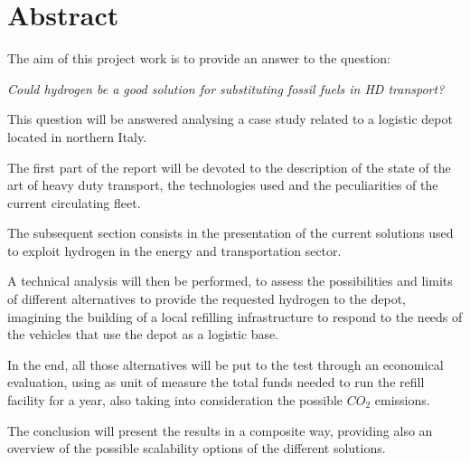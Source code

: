 \chapter*{Abstract} 
The aim of this project work is to provide an answer to the question:

\textit{Could hydrogen be a good solution for substituting fossil fuels in HD transport?}

This question will be answered analysing a case study related to a logistic depot located in northern Italy.

The first part of the report will be devoted to the description of the state of the art of heavy duty transport, the technologies used and the peculiarities of the current circulating fleet.

The subsequent section consists in the presentation of the current solutions used to exploit hydrogen in the energy and transportation sector.

A technical analysis will then be performed, to assess the possibilities and limits of different alternatives to provide the requested hydrogen to the depot, imagining the building of a local refilling infrastructure to respond to the needs of the vehicles that use the depot as a logistic base.

In the end, all those alternatives will be put to the test through an economical evaluation, using as unit of measure the total funds needed to run the refill facility for a year, also taking into consideration the possible $CO_2$ emissions.

The conclusion will present the results in a composite way, providing also an overview of the possible scalability options of the different solutions.